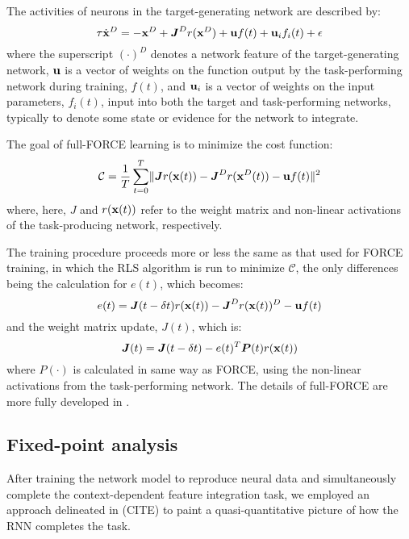 \documentclass[12pt,a4paper,final]{iopart}
\begin{document}
The activities of neurons in the target-generating network are described by:
\[
    \tau \dot{{\bf x}}^D = -{\bf x}^D + \boldsymbol{J}^D r({\bf x}^D) + {\bf u}f(t) + {\bf u}_i f_i(t) + {\bf \epsilon}
\]
where the superscript $(\cdot)^D$ denotes a network feature of the target-generating network, ${\bf u}$ is a vector of weights on the function output by the task-performing network during training, $f(t)$, and ${\bf u}_i$ is a vector of weights on the input parameters, $f_i(t)$, input into both the target and task-performing networks, typically to denote some state or evidence for the network to integrate.

The goal of full-FORCE learning is to minimize the cost function:
\[
    \mathcal{C} = \frac{1}{T} \sum_{t=0}^T \lVert \boldsymbol{J} r({\bf x}(t)) - \boldsymbol{J}^D r({\bf x}^D(t)) - {\bf u}f(t) \rVert ^2
\]
where, here, $J$ and $r({\bf x}(t))$ refer to the weight matrix and non-linear activations of the task-producing network, respectively. 

The training procedure proceeds more or less the same as that used for FORCE training, in which the RLS algorithm is run to minimize $\mathcal{C}$, the only differences being the calculation for $e(t)$, which becomes:
\[
    e(t) = \boldsymbol{J}(t - \delta t) r({\bf x}(t)) - \boldsymbol{J}^D r({\bf x}(t))^D - {\bf u}f(t)
\]
and the weight matrix update, $J(t)$, which is:
\[
    \boldsymbol{J}(t) = \boldsymbol{J}(t - \delta t) - e(t)^T \boldsymbol{P}(t) r({\bf x}(t))
\]
where $P(\cdot)$ is calculated in same way as FORCE, using the non-linear activations from the task-performing network. The details of full-FORCE are more fully developed in \cite{DePasquale}.

\subsection{Fixed-point analysis}
After training the network model to reproduce neural data and simultaneously complete the context-dependent feature integration task, we employed an approach delineated in (CITE) to paint a quasi-quantitative picture of how the RNN completes the task.
\end{document}
